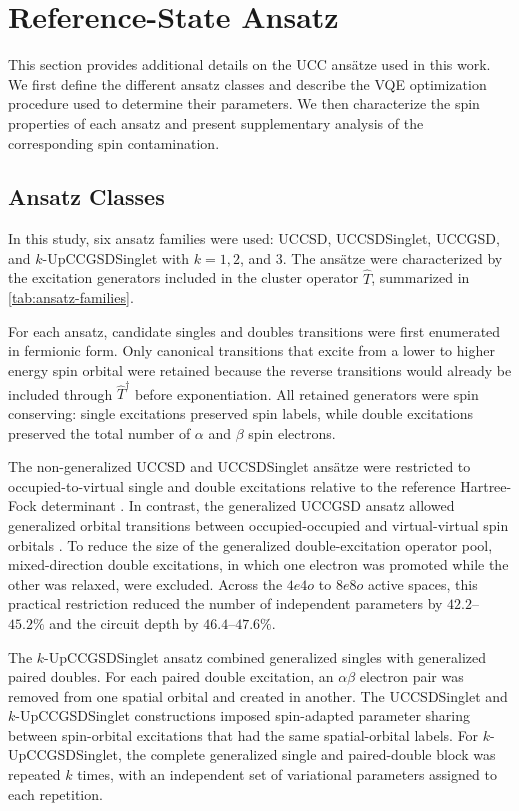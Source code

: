 \section{Reference-State Ansatz}
\label{sec:si-ansatz}
This section provides additional details on the UCC ansätze used in this work. 
We first define the different ansatz classes and describe the VQE optimization procedure used to determine their parameters. 
We then characterize the spin properties of each ansatz and present supplementary analysis of the corresponding spin contamination.

\subsection{Ansatz Classes}
\label{sec:si-ansatz-classes}

In this study, six ansatz families were used: UCCSD, UCCSDSinglet,
UCCGSD, and \(k\)-UpCCGSDSinglet with \(k=1,2\), and \(3\).
The ansätze were characterized by the excitation generators included in the cluster operator $\hat{T}$, summarized in \cref{tab:ansatz-families}.

For each ansatz, candidate singles and doubles transitions were first enumerated in fermionic form. 
Only canonical transitions that excite from a lower to higher energy spin orbital were retained because the reverse transitions would already be included through $\hat{T}^{\dagger}$ before exponentiation. All retained generators were spin conserving: single excitations preserved spin labels, while double excitations preserved the total number of $\alpha$ and $\beta$ spin electrons. 

The non-generalized UCCSD and UCCSDSinglet ansätze were restricted to occupied-to-virtual single and double excitations relative to the reference Hartree-Fock determinant \cite{Anand2022UCCReview}. In contrast, the generalized UCCGSD ansatz allowed generalized orbital transitions between occupied-occupied and virtual-virtual spin orbitals \cite{Lee2018GeneralisedAnsatzOriginal, Diniz2021GeneralisedAnsatzAdaptations}.
To reduce the size of the generalized double-excitation operator pool, mixed-direction double excitations, in which one electron was promoted while the other was relaxed, were excluded. Across the $4e4o$ to $8e8o$ active spaces, this practical restriction reduced the number of independent parameters by $42.2$--$45.2\%$ and the circuit depth by $46.4$--$47.6\%$.

The $k$-UpCCGSDSinglet ansatz combined generalized singles with generalized paired doubles. For each paired double excitation, an $\alpha\beta$ electron pair was removed from one spatial orbital and created in another. 
The UCCSDSinglet and $k$-UpCCGSDSinglet constructions imposed spin-adapted parameter sharing between spin-orbital excitations that had the same spatial-orbital labels. 
For $k$-UpCCGSDSinglet, the complete generalized single and paired-double block was repeated $k$ times, with an independent set of variational parameters assigned to each repetition. 

